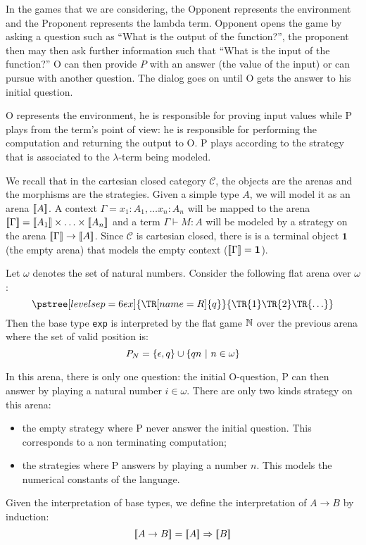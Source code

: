 In the games that we are considering, the Opponent represents the
environment and the Proponent represents the lambda term. Opponent
opens the game by asking a question such as ``What is the output of
the function?'', the proponent then may then ask further information
such that ``What is the input of the function?'' O can then provide
$P$ with an answer (the value of the input) or can pursue with
another question. The dialog goes on until O gets the answer to his
initial question.

O represents the environment, he is responsible for proving input
values while P plays from the term's point of view: he is
responsible for performing the computation and returning the output
to O. P plays according to the strategy that is associated to the
$\lambda$-term being modeled.

We recall that in the cartesian closed category $\mathcal{C}$, the
objects are the arenas and the morphisms are the strategies. Given a
simple type $A$, we will model it as an arena ${[\![ A ]\!]}$. A context
$\Gamma = x_1 :A_1, \ldots x_n:A_n$ will be mapped to the arena
${[\![ \Gamma ]\!]} = {[\![ A_1 ]\!]} \times \ldots \times {[\![A_n ]\!]}$ and a term
$\Gamma \vdash M : A$ will be modeled by a strategy on the arena
${[\![ \Gamma ]\!]} \rightarrow {[\![A ]\!]}$. Since $\mathcal{C}$ is cartesian
closed, there is is a terminal object $\textbf{1}$ (the empty arena)
that models the empty context (${[\![ \Gamma ]\!]} = \textbf{1}$).


Let $\omega$ denotes the set of natural numbers. Consider the
following flat arena over $\omega$:
$$  \pstree[levelsep=6ex]
    {\TR[name=R]{q}}
    { \TR{1} \TR{2} \TR{\ldots}
    }
$$
Then the base type \texttt{exp} is interpreted by the flat game
$\mathbb{N}$ over the previous arena where the set of valid position is:
$$P_N = \{ \epsilon, q \} \cup \{ qn \ | \ n \in \omega \}$$


In this arena, there is only one question: the initial O-question, P
can then answer by playing a natural number $i \in \omega$. There
are only two kinds strategy on this arena:
\begin{itemize}
\item the empty strategy where P never answer the initial question. This corresponds to a non terminating computation;
\item the strategies where P answers by playing a number $n$. This models the numerical constants of the language.
\end{itemize}

Given the interpretation of base types, we define the interpretation
of $A\rightarrow B$ by induction:
$${[\![ A \rightarrow B ]\!]} = {[\![ A ]\!]} \Rightarrow {[\![B ]\!]}$$

